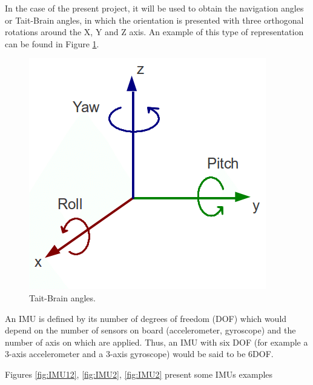 In the case of the present project, it will be used to obtain the navigation angles or Tait-Brain angles, in which the orientation is presented with three orthogonal rotations around the X, Y and Z axis. An example of this type of representation can be found in Figure \ref{fig:orientacion}.\newline


\begin{figure}[H]
	\center
	\includegraphics[scale=0.5]{imagenes/Balancing_robot/orientacion}
	\caption{Tait-Brain angles.}
	\label{fig:orientacion}
\end{figure}


An IMU is defined by its number of degrees of freedom (DOF) which would depend on the number of sensors on board (accelerometer, gyroscope) and the number of axis on which are applied. Thus, an IMU with six DOF (for example a 3-axis accelerometer and a 3-axis gyroscope) would be said to be 6DOF. \newline

Figures \ref{fig:IMU12}, \ref{fig:IMU2}, \ref{fig:IMU2} present some IMUs examples

